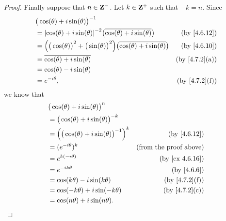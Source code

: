 \begin{proof}
  Finally suppose that \(n \in \mathbf{Z}^-\).
  Let \(k \in \mathbf{Z}^+\) such that \(-k = n\).
  Since
  \begin{align*}
     & \big(\cos(\theta) + i \sin(\theta)\big)^{-1}                                                                                                     \\
     & = \abs{\cos(\theta) + i \sin(\theta)}^{-2} \big(\overline{\cos(\theta) + i \sin(\theta)}\big)                      & \text{(by \cref{4.6.12})}   \\
     & = \Big(\big(\cos(\theta)\big)^2 + \big(\sin(\theta)\big)^2\Big) \big(\overline{\cos(\theta) + i \sin(\theta)}\big) & \text{(by \cref{4.6.10})}   \\
     & = \overline{\cos(\theta) + i \sin(\theta)}                                                                         & \text{(by \cref{4.7.2}(a))} \\
     & = \cos(\theta) - i \sin(\theta)                                                                                                                  \\
     & = e^{- i \theta},                                                                                                  & \text{(by \cref{4.7.2}(f))}
  \end{align*}
  we know that
  \begin{align*}
     & \big(\cos(\theta) + i \sin(\theta)\big)^n                                                  \\
     & = \big(\cos(\theta) + i \sin(\theta)\big)^{-k}                                             \\
     & = \Big(\big(\cos(\theta) + i \sin(\theta)\big)^{-1}\Big)^k & \text{(by \cref{4.6.12})}     \\
     & = (e^{- i \theta})^k                                       & \text{(from the proof above)} \\
     & = e^{k (- i \theta)}                                       & \text{(by \cref{ex 4.6.16})}  \\
     & = e^{- i k \theta}                                         & \text{(by \cref{4.6.6})}      \\
     & = \cos(k \theta) - i \sin(k \theta)                        & \text{(by \cref{4.7.2}(f))}   \\
     & = \cos(- k \theta) + i \sin(- k \theta)                    & \text{(by \cref{4.7.2}(c))}   \\
     & = \cos(n \theta) + i \sin(n \theta).
  \end{align*}

\end{proof}
